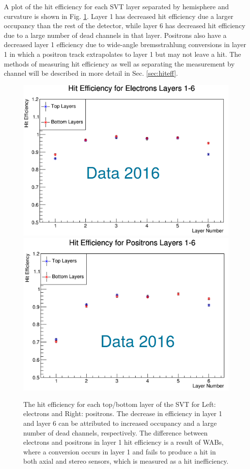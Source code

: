 A plot of the hit efficiency for each SVT layer separated by hemisphere and curvature is shown in Fig. \ref{fig:hitefflay}. Layer 1 has decreased hit efficiency due a larger occupancy than the rest of the detector, while layer 6 has decreased hit efficiency due to a large number of dead channels in that layer. Positrons also have a decreased layer 1 efficiency due to wide-angle bremsstrahlung conversions in layer 1 in which a positron track extrapolates to layer 1 but may not leave a hit. The methods of measuring hit efficiency as well as separating the measurement by channel will be described in more detail in Sec. \ref{sec:hiteff}.

\begin{figure}[t]
    \centering
    \includegraphics[width=.45\textwidth]{figs/recon/hitefflayele.png}
    \includegraphics[width=.45\textwidth]{figs/recon/hitefflaypos.png}
    \caption{The hit efficiency for each top/bottom layer of the SVT for Left: electrons and Right: positrons. The decrease in efficiency in layer 1 and layer 6 can be attributed to increased occupancy and a large number of dead channels, respectively. The difference between electrons and positrons in layer 1 hit efficiency is a result of WABs, where a conversion occurs in layer 1 and fails to produce a hit in both axial and stereo sensors, which is measured as a hit inefficiency.
    }
    \label{fig:hitefflay}
\end{figure}

\clearpage


